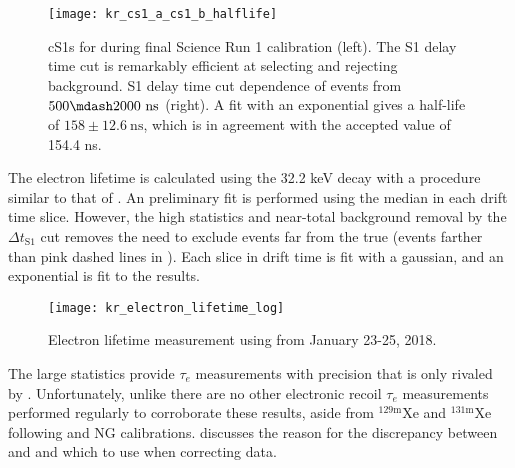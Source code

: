\begin{figure}
\centering
\texttt{[image: kr\_cs1\_a\_cs1\_b\_halflife]}
\caption{cS1s for \metakr during final Science Run 1 calibration (left).  The S1 delay time cut is remarkably efficient at selecting
\metakr and rejecting background.  S1 delay time cut dependence of events from $500 \mdash 2000\ \mathrm{ns}$ (right).  A fit with
an exponential gives a half-life of $158 \pm 12.6\ \mathrm{ns}$, which is in agreement with the accepted value of 154.4 ns.}
\label{fig:electron_lifetimes_measurement_kr_cs1_halflife}
\end{figure}

The electron lifetime is calculated using the 32.2 keV decay with a procedure similar to that of \alphadecays
{}.  An preliminary fit is performed using the median \stwob in each drift time
slice.  However, the high statistics and near-total background removal by the $\Delta t_{\mathrm{S1}}$ cut
removes the need to exclude events far from the true \metakr (events farther than pink dashed lines in
).  Each slice in drift time is fit with a gaussian, and an exponential
is fit to the results.

\begin{figure}
\centering
\texttt{[image: kr\_electron\_lifetime\_log]}
\caption{Electron lifetime measurement using \metakr from January 23-25, 2018.}
\label{fig:electron_lifetimes_measurement_kr_elifetime}
\end{figure}

The large statistics provide $\tau_e$ measurements with precision that is only rivaled by .  Unfortunately, unlike
\alphadecays there are no other electronic recoil $\tau_e$ measurements performed regularly to corroborate these results, aside from
$\mathrm{^{129m}Xe}$ and $\mathrm{^{131m}Xe}$ following \ambe and NG calibrations.  
discusses the reason for the discrepancy between \alphadecays and \metakr and which to use when correcting data.



